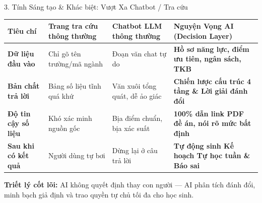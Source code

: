 \documentclass[aspectratio=169, 10pt]{beamer}
\begin{document}
\begin{frame}{3. Tính Sáng tạo \& Khác biệt: Vượt Xa Chatbot / Tra cứu}
\begin{table}[]
\small
\centering
\begin{tabular}{p{3.2cm} p{3.6cm} p{3.6cm} p{3.8cm}}
\toprule
\textbf{Tiêu chí} & \textbf{Trang tra cứu thông thường} & \textbf{Chatbot LLM thông thường} & \textbf{Nguyện Vọng AI (Decision Layer)} \\
\midrule
\textbf{Dữ liệu đầu vào} & Chỉ gõ tên trường/mã ngành & Đoạn văn chat tự do & \textbf{Hồ sơ năng lực, điểm ưu tiên, ngân sách, TKB} \\
\midrule
\textbf{Bản chất trả lời} & Bảng số liệu tĩnh quá khứ & Văn xuôi tổng quát, dễ ảo giác & \textbf{Chiến lược cấu trúc 4 tầng \& Lời giải đánh đổi} \\
\midrule
\textbf{Độ tin cậy số liệu} & Khó xác minh nguồn gốc & Bịa điểm chuẩn, bịa xác suất & \textbf{100\% dẫn link PDF đề án, nói rõ mức bất định} \\
\midrule
\textbf{Sau khi có kết quả} & Người dùng tự bơi & Dừng lại ở câu trả lời & \textbf{Tự động sinh Kế hoạch Tự học tuần \& Báo sai} \\
\bottomrule
\end{tabular}
\end{table}

\begin{tcolorbox}[colback=XanhChuDao!10,colframe=XanhChuDao]
\centering
\textbf{Triết lý cốt lõi:} AI không quyết định thay con người — AI phân tích đánh đổi, minh bạch giả định và trao quyền tự chủ tối đa cho học sinh.
\end{tcolorbox}
\end{frame}
\end{document}
